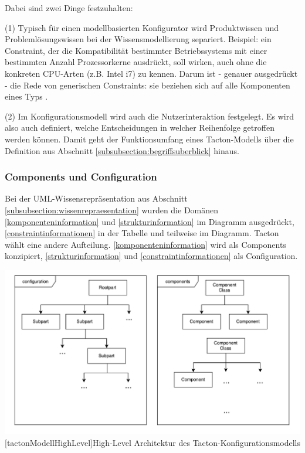 \documentclass[12pt,a4paper,bibliography=totocnumbered,listof=totoc]{scrartcl}
\begin{document}
Dabei sind zwei Dinge festzuhalten:

(1) Typisch für einen modellbasierten Konfigurator wird Produktwissen und Problemlösungswissen bei der Wissensmodellierung separiert. Beispiel: ein Constraint, der die Kompatibilität bestimmter Betriebssystems mit einer bestimmten Anzahl Prozessorkerne ausdrückt, soll wirken, auch ohne die konkreten CPU-Arten (z.B. Intel i7) zu kennen. Darum ist - genauer ausgedrückt - die Rede von generischen Constraints: sie beziehen sich auf alle Komponenten eines Typs \citep{felferning14}.

(2) Im Konfigurationsmodell wird auch die Nutzerinteraktion festgelegt. Es wird also auch definiert, welche Entscheidungen in welcher Reihenfolge getroffen werden können. Damit geht der Funktionsumfang eines Tacton-Modells über die Definition aus Abschnitt \ref{subsubsection:begriffsuberblick} hinaus.

\subsubsection{Components und Configuration}
Bei der UML-Wissensrepräsentation aus Abschnitt \ref{subsubsection:wissenrepraesentation} wurden die Domänen \ref{komponenteninformation} und \ref{strukturinformation} im Diagramm ausgedrückt,  \ref{constraintinformationen} in der Tabelle und teilweise im Diagramm. Tacton wählt eine andere Aufteilung. \ref{komponenteninformation} wird als \glqq Components\grqq{} konzipiert, \ref{strukturinformation} und \ref{constraintinformationen} als \glqq Configuration\grqq{}.

\vspace{1em}
\begin{minipage}{\linewidth}
	\centering
	\includegraphics[width=1\linewidth]{Abbildungen/tactonModellHighLevel.pdf}
	[tactonModellHighLevel]{High-Level Architektur des Tacton-Konfigurationsmodells}
	\label{fig:tactonModellHighLevel}
\end{minipage}
\vspace{1em}
\end{document}
